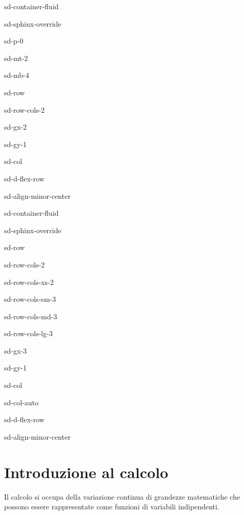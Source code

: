 \documentclass[letterpaper,10pt,english]{jupyterBook}
\begin{document}
\begin{sphinxuseclass}{sd-container-fluid}
\begin{sphinxuseclass}{sd-sphinx-override}
\begin{sphinxuseclass}{sd-p-0}
\begin{sphinxuseclass}{sd-mt-2}
\begin{sphinxuseclass}{sd-mb-4}
\begin{sphinxuseclass}{sd-row}
\begin{sphinxuseclass}{sd-row-cols-2}
\begin{sphinxuseclass}{sd-gx-2}
\begin{sphinxuseclass}{sd-gy-1}
\begin{sphinxuseclass}{sd-col}
\begin{sphinxuseclass}{sd-d-flex-row}
\begin{sphinxuseclass}{sd-align-minor-center}
\begin{sphinxuseclass}{sd-container-fluid}
\begin{sphinxuseclass}{sd-sphinx-override}
\begin{sphinxuseclass}{sd-row}
\begin{sphinxuseclass}{sd-row-cols-2}
\begin{sphinxuseclass}{sd-row-cols-xs-2}
\begin{sphinxuseclass}{sd-row-cols-sm-3}
\begin{sphinxuseclass}{sd-row-cols-md-3}
\begin{sphinxuseclass}{sd-row-cols-lg-3}
\begin{sphinxuseclass}{sd-gx-3}
\begin{sphinxuseclass}{sd-gy-1}
\begin{sphinxuseclass}{sd-col}
\begin{sphinxuseclass}{sd-col-auto}
\begin{sphinxuseclass}{sd-d-flex-row}
\begin{sphinxuseclass}{sd-align-minor-center}
\end{sphinxuseclass}
\end{sphinxuseclass}
\end{sphinxuseclass}
\end{sphinxuseclass}
\end{sphinxuseclass}
\end{sphinxuseclass}
\end{sphinxuseclass}
\end{sphinxuseclass}
\end{sphinxuseclass}
\end{sphinxuseclass}
\end{sphinxuseclass}
\end{sphinxuseclass}
\end{sphinxuseclass}
\end{sphinxuseclass}
\end{sphinxuseclass}
\end{sphinxuseclass}
\end{sphinxuseclass}
\end{sphinxuseclass}
\end{sphinxuseclass}
\end{sphinxuseclass}
\end{sphinxuseclass}
\end{sphinxuseclass}
\end{sphinxuseclass}
\end{sphinxuseclass}
\end{sphinxuseclass}
\end{sphinxuseclass}

\chapter{Introduzione al calcolo}
\label{\detokenize{ch/calculus:introduzione-al-calcolo}}\label{\detokenize{ch/calculus:math-hs-calculus}}\label{\detokenize{ch/calculus::doc}}
\sphinxAtStartPar
Il calcolo si occupa della variazione continua di grandezze matematiche che possono essere rappresentate come funzioni di variabili indipendenti.
\end{document}
